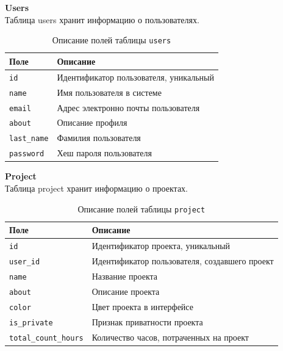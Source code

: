 \noindent\textbf{Users}\\
Таблица users хранит информацию о пользователях.
\begin{table}[!ht]
	\caption{Описание полей таблицы \texttt{users}}
	\label{tbl:users}
	\begin{center}
		\begin{tabular}{|p{}|p{}|}
			\hline
			\textbf{Поле} & \textbf{Описание} \\\hline
			\texttt{id} & Идентификатор пользователя, уникальный \\\hline
			\texttt{name} & Имя пользователя в системе\\\hline
			\texttt{email} & Адрес электронно почты пользователя \\\hline
			\texttt{about} & Описание профиля \\\hline
			\texttt{last\_name} & Фамилия пользователя \\\hline
			\texttt{password} &Хеш пароля пользователя \\\hline
		\end{tabular}
	\end{center}
\end{table}

\newpage
\noindent\textbf{Project}\\
Таблица project хранит информацию о проектах.
\begin{table}[ht]
	\caption{Описание полей таблицы \texttt{project}}
	\label{tbl:project}
	\begin{center}
		\begin{tabular}{|p{}|p{}|}
			\hline
			\textbf{Поле} & \textbf{Описание} \\\hline
			\texttt{id} & Идентификатор проекта, уникальный \\\hline
			\texttt{user\_id} & Идентификатор пользователя, создавшего проект \\\hline
			\texttt{name} & Название проекта \\\hline
			\texttt{about} & Описание проекта \\\hline
			\texttt{color} & Цвет проекта в интерфейсе \\\hline
			\texttt{is\_private} & Признак приватности проекта \\\hline
			\texttt{total\_count\_hours} & Количество часов, потраченных на проект \\\hline	
	\end{tabular}
	\end{center}
\end{table}

